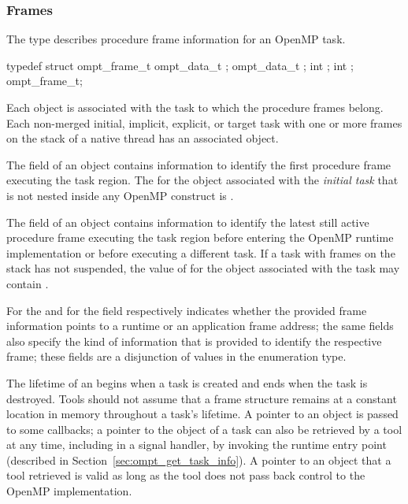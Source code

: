 \subsubsection{Frames}
\label{sec:ompt_frame_t}
\summary
The  type describes procedure frame information for an OpenMP task.

\syntax
\begin{ccppspecific}
\begin{ompSyntax}
typedef struct ompt_frame_t {
  ompt_data_t ;
  ompt_data_t ;
  int ;
  int ;
} ompt_frame_t;
\end{ompSyntax}
\end{ccppspecific}

\descr

Each  object is associated with the task to which the procedure frames belong.
Each non-merged initial, implicit, explicit, or target task with one or more frames on
the stack of a native thread has an associated  object.

The  field of an  object contains
information to identify the first procedure frame executing the 
task region.
The  for the  object associated with 
the \emph{initial task} that is not nested inside any OpenMP construct 
is .

The  field of an  object contains
information to identify the latest still active procedure frame 
executing the task region before entering the OpenMP runtime 
implementation or before executing a different task.
If a task with frames on the stack has not suspended, the value of
 for the  object
associated with the task may contain .

For  the  and for  
the  field respectively indicates whether 
the provided frame information points to a runtime or an 
application frame address;
the same fields also specify the kind of information that is 
provided to identify the respective frame; 
these fields are a disjunction of values in the
 enumeration type.

The lifetime of an  begins when a task is created
and ends when the task is destroyed. Tools should not assume that
a frame structure remains at a constant location in memory throughout
a task's lifetime. 
A pointer to an  object is passed to
some callbacks; a pointer to the  object of a task
can also be retrieved by a tool at any time, including in a signal
handler, by invoking the
 runtime entry point (described in
Section~\ref{sec:ompt_get_task_info}).
A pointer to an  object that a tool retrieved
is valid as long as the tool does not pass back control to the OpenMP
implementation.


